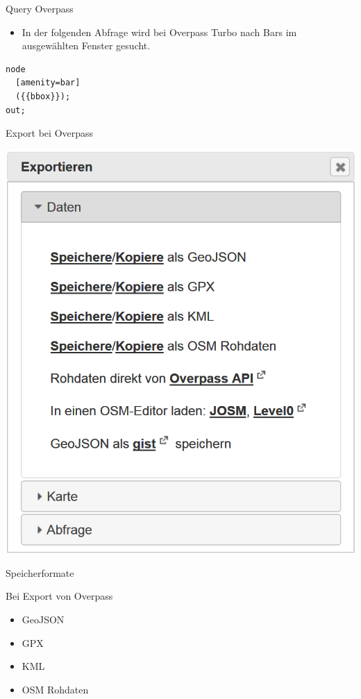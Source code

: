 \documentclass[ignorenonframetext,]{beamer}
\providecommand{\tightlist}{%
  \setlength{\itemsep}{0pt}\setlength{\parskip}{0pt}}
\begin{document}
\begin{frame}[fragile]{Query Overpass}
\protect\hypertarget{query-overpass}{}

\begin{itemize}
\tightlist
\item
  In der folgenden Abfrage wird bei Overpass Turbo nach Bars im
  ausgewählten Fenster gesucht.
\end{itemize}

\begin{verbatim}
node
  [amenity=bar]
  ({{bbox}});
out;
\end{verbatim}

\end{frame}

\begin{frame}{Export bei Overpass}
\protect\hypertarget{export-bei-overpass}{}

\includegraphics{figure/OverpassExport.PNG}

\end{frame}

\begin{frame}{Speicherformate}
\protect\hypertarget{speicherformate}{}

\begin{block}{Bei Export von Overpass}

\begin{itemize}
\tightlist
\item
  GeoJSON
\item
  GPX
\item
  KML
\item
  OSM Rohdaten
\end{itemize}

\end{block}

\end{frame}
\end{document}
